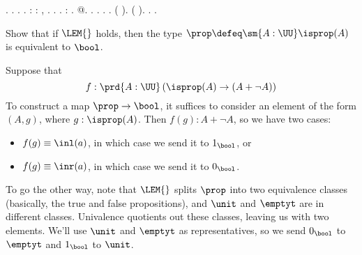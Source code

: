 \begin{coqdoccode}
 .  .  .\coqdoceol
\coqdocnoindent
{}.\coqdoceol
\coqdocemptyline
\coqdocnoindent
{}  : \coqdockw{\ensuremath{\forall}}   :  ,  \coqdocnotation{=} .\coqdoceol
\coqdocindent{1.00em}
 .\coqdoceol
\coqdocnoindent
{}.\coqdoceol
\coqdocemptyline
\coqdocnoindent
{}  : \coqdocnotation{(} \coqdocnotation{)} \coqdocnotation{\ensuremath{\eqvsym}} .\coqdoceol
\coqdocindent{1.00em}
 @.\coqdoceol
\coqdocindent{1.00em}
 .  .\coqdoceol
\coqdocindent{1.00em}
 .  .\coqdoceol
\coqdocindent{1.00em}
 (  ).\coqdoceol
\coqdocindent{1.00em}
 (  ).\coqdoceol
\coqdocnoindent
{}.\coqdoceol
\coqdocemptyline
\coqdocnoindent
{} .\coqdoceol
\coqdocemptyline
\end{coqdoccode}
Show that if $\LEM{}$ holds, then the type $\prop \defeq \sm{A:\UU}\isprop(A)$
is equivalent to $\bool$.


 \soln
Suppose that 
\[
  f : \prd{A:\UU}\left(\isprop(A) \to (A + \lnot A)\right)
\]
To construct a map $\prop \to \bool$, it suffices to consider an element of the
form $(A, g)$, where $g : \isprop(A)$.  Then $f(g) : A + \lnot A$, so we have
two cases:



\begin{itemize}
\item  $f(g) \equiv \inl(a)$, in which case we send it to $1_{\bool}$, or

\item  $f(g) \equiv \inr(a)$, in which case we send it to $0_{\bool}$.

\end{itemize}
To go the other way, note that $\LEM{}$ splits $\prop$ into two equivalence
classes (basically, the true and false propositions), and $\unit$ and $\emptyt$
are in different classes.  Univalence quotients out these classes, leaving us
with two elements.  We'll use $\unit$ and $\emptyt$ as representatives, so we
send $0_{\bool}$ to $\emptyt$ and $1_{\bool}$ to $\unit$.


